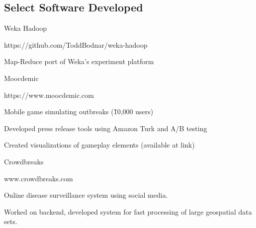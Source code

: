 \documentclass[margin,line]{res}
\newcommand{\linkToUrl}[1]{{\color{blue}\underline{\href{#1}{Link}}}}
\newenvironment{list1}{
  \begin{list}{\ding{113}}{%
      \setlength{\itemsep}{0in}
      \setlength{\parsep}{0in} \setlength{\parskip}{0in}
      \setlength{\topsep}{0in} \setlength{\partopsep}{0in} 
      \setlength{\leftmargin}{0.17in}}}{\end{list}}
\begin{document}
\begin{resume}








\section{\sc Select Software Developed}
Weka Hadoop
\begin{list1}
\item[] https://github.com/ToddBodnar/weka-hadoop
\item[] Map-Reduce port of Weka's experiment platform
\end{list1}

Moocdemic
\begin{list1}
\item[] https://www.moocdemic.com
\item[] Mobile game simulating outbreaks (\~10,000 users)
\item[] Developed press release tools using Amazon Turk and A/B testing 
\item[] Created visualizations of gameplay elements (available at link)  
\end{list1}

Crowdbreaks%
\begin{list1}
\item[] www.crowdbreaks.com
\item[] Online disease surveillance system using social media.
\item[] Worked on backend, developed system for fast processing of large geospatial data sets.
\end{list1}


\end{resume}
\end{document}
